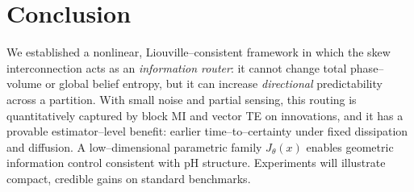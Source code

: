 \documentclass[final,5p,times,twocolumn]{elsarticle}
\begin{document}
\section{Conclusion}
We established a nonlinear, Liouville--consistent framework in which the skew interconnection acts as an \emph{information router}: it cannot change total phase--volume or global belief entropy, but it can increase \emph{directional} predictability across a partition. With small noise and partial sensing, this routing is quantitatively captured by block MI and vector TE on innovations, and it has a provable estimator--level benefit: earlier time--to--certainty under fixed dissipation and diffusion. A low--dimensional parametric family \(J_\theta(x)\) enables geometric information control consistent with pH structure. Experiments will illustrate compact, credible gains on standard benchmarks.



\end{document}
